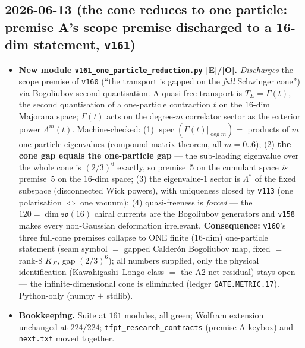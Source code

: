 \documentclass[11pt]{article}
\providecommand{\mE}{\textbf{[E]}}\providecommand{\mC}{\textbf{[C]}}
\providecommand{\mO}{\textbf{[O]}}\providecommand{\mX}{\textbf{[X]}}
\providecommand{\vref}[1]{\texttt{#1}}
\begin{document}
\subsection*{2026-06-13 (the cone reduces to one particle: premise A's scope premise discharged to a 16-dim statement, \vref{v161})}
\begin{itemize}
\item \textbf{New module \texttt{v161\_one\_particle\_reduction.py} \mE/\mO.} \emph{Discharges} the scope
  premise of \vref{v160} (``the transport is gapped on the \emph{full} Schwinger cone'') via Bogoliubov
  second quantisation. A quasi-free transport is $T_\Sigma{=}\Gamma(t)$, the second quantisation of a
  one-particle contraction $t$ on the $16$-dim Majorana space; $\Gamma(t)$ acts on the degree-$m$ correlator
  sector as the exterior power $\Lambda^m(t)$. Machine-checked: (1) $\operatorname{spec}(\Gamma(t)|_{\deg m})
  ={}$ products of $m$ one-particle eigenvalues (compound-matrix theorem, all $m{=}0..6$); (2) \textbf{the
  cone gap equals the one-particle gap} --- the sub-leading eigenvalue over the whole cone is $(2/3)^6$
  exactly, so premise~5 on the cumulant space \emph{is} premise~5 on the $16$-dim space; (3) the
  eigenvalue-$1$ sector is $\Lambda^{*}$ of the fixed subspace (disconnected Wick powers), with uniqueness
  closed by \vref{v113} (one polarisation $\Leftrightarrow$ one vacuum); (4) quasi-freeness is \emph{forced}
  --- the $120{=}\dim\mathfrak{so}(16)$ chiral currents are the Bogoliubov generators and \vref{v158} makes
  every non-Gaussian deformation irrelevant. \textbf{Consequence:} \vref{v160}'s three full-cone premises
  collapse to ONE finite ($16$-dim) one-particle statement (seam symbol $=$ gapped Calder\'on Bogoliubov
  map, fixed $=$ rank-$8$ $K_\Sigma$, gap $(2/3)^6$); all numbers supplied, only the physical identification
  (Kawahigashi--Longo class $=$ the A2 net residual) stays open --- the infinite-dimensional cone is
  eliminated (ledger \texttt{GATE.METRIC.17}). Python-only (numpy $+$ stdlib).
\item \textbf{Bookkeeping.} Suite at $161$ modules, all green; Wolfram extension unchanged at $224/224$;
  \texttt{tfpt\_research\_contracts} (premise-A keybox) and \texttt{next.txt} moved together.
\end{itemize}
\end{document}
